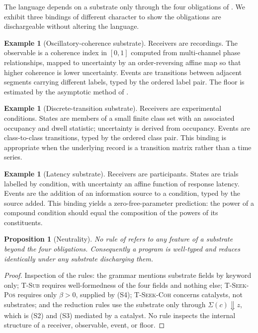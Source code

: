 \documentclass[11pt,a4paper]{article}
\theoremstyle{thmstyle}
\newtheorem{proposition}[theorem]{Proposition}
\theoremstyle{definition}
\newtheorem{example}[theorem]{Example}
\theoremstyle{remark}
\newcommand{\flo}{\beta}
\newcommand{\store}{\Sigma}
\begin{document}
The language depends on a substrate only through the four obligations of
. We exhibit three bindings of different character to
show the obligations are discharge\-able without altering the language.

\begin{example}[Oscillatory-coherence substrate]
\label{ex:osc}
Receivers are recordings. The observable is a coherence index in $[0,1]$
computed from multi-channel phase relationships, mapped to uncertainty by an
order-reversing affine map so that higher coherence is lower uncertainty.
Events are transitions between adjacent segments carrying different labels,
typed by the ordered label pair. The floor is estimated by the asymptotic
method of .
\end{example}

\begin{example}[Discrete-transition substrate]
\label{ex:discrete}
Receivers are experimental conditions. States are members of a small finite
class set with an associated occupancy and dwell statistic; uncertainty is
derived from occupancy. Events are class-to-class transitions, typed by the
ordered class pair. This binding is appropriate when the underlying record
is a transition matrix rather than a time series.
\end{example}

\begin{example}[Latency substrate]
\label{ex:latency}
Receivers are participants. States are trials labelled by condition, with
uncertainty an affine function of response latency. Events are the addition
of an information source to a condition, typed by the source added. This
binding yields a zero-free-parameter prediction: the power of a compound
condition should equal the composition of the powers of its constituents.
\end{example}

\begin{proposition}[Neutrality]
\label{prop:neutrality}
No rule of  refers to any feature
of a substrate beyond the four obligations. Consequently a program is
well-typed and reduces identically under any substrate discharging them.
\end{proposition}

\begin{proof}
Inspection of the rules: the grammar mentions substrate fields by keyword
only; \textsc{T-Sub} requires well-formedness of the four fields and nothing
else; \textsc{T-Seek-Pos} requires only $\flo>0$, supplied by (S4);
\textsc{T-Seek-Coh} concerns catalysts, not substrates; and the reduction
rules use the substrate only through $\store(c)\Downarrow z$, which is (S2)
and (S3) mediated by a catalyst. No rule inspects the internal structure of
a receiver, observable, event, or floor.
\end{proof}
\end{document}
